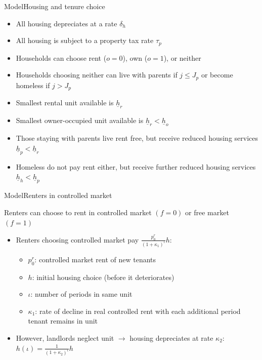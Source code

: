 \documentclass[11pt,aspectratio=169]{beamer}
\begin{document}
\begin{frame}{Model}{Housing and tenure choice}

\begin{itemize}
    \item All housing depreciates at a rate $\delta_{h}$
    \item All housing is subject to a property tax rate $\tau_{p}$
\end{itemize}

\vspace{0.3cm}

\begin{itemize}
    \item Households can choose rent ($o=0$), own ($o=1$), or neither
    \item Households choosing neither can live with parents if $j\leq J_{p}$ or become homeless if $j>J_{p}$
\end{itemize}

\vspace{0.3cm}

\begin{itemize}
    \item Smallest rental unit available is $\underline{h}_{r}$ 
    \item Smallest owner-occupied unit available is $\underline{h}_{r}<\underline{h}_{o}$
    \item Those staying with parents live rent free, but receive reduced housing services $\underline{h}_{p}<\underline{h}_{r}$
    \item Homeless do not pay rent either, but receive further reduced housing services $\underline{h}_{h}<\underline{h}_{p}$
\end{itemize}

\end{frame}

\begin{frame}{Model}{Renters in controlled market}

Renters can choose to rent in controlled market $(f=0)$ or free market $(f=1)$ 
\begin{itemize}
    \item Renters choosing controlled market pay $\frac{p^{r}_{0}}{(1+\kappa_{1})^{\iota}} h$: 
    \begin{itemize}
        \item $p^{r}_{0}$: controlled market rent of new tenants
        \item $h$: initial housing choice (before it deteriorates)
        \item $\iota$: number of periods in same unit
        \item $\kappa_{1}$: rate of decline in real controlled rent with each additional period tenant remains in unit
    \end{itemize}
    \item However, landlords neglect unit $\rightarrow$ housing depreciates at rate $\kappa_{2}$: $h(\iota)=\frac{1}{(1+\kappa_{2})^{\iota}} h$
\end{itemize}

\end{frame}
\end{document}
